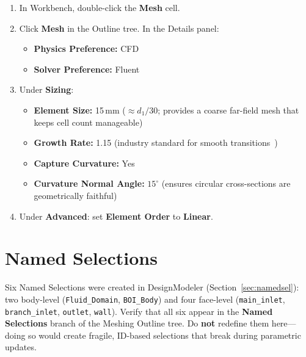 \documentclass[12pt,a4paper]{report}
\begin{document}
\begin{enumerate}
  \item In Workbench, double-click the \textbf{Mesh} cell.
  \item Click \textbf{Mesh} in the Outline tree.  In the Details panel:
  \begin{itemize}
    \item \textbf{Physics Preference:} CFD
    \item \textbf{Solver Preference:} Fluent
  \end{itemize}
  \item Under \textbf{Sizing}:
  \begin{itemize}
    \item \textbf{Element Size:} 15\,mm \quad ($\approx d_1/30$; provides a
          coarse far-field mesh that keeps cell count manageable)
    \item \textbf{Growth Rate:} 1.15 \quad (industry standard for smooth
          transitions~\cite{ANSYSFluentUG2024})
    \item \textbf{Capture Curvature:} Yes
    \item \textbf{Curvature Normal Angle:} $15^\circ$ \quad (ensures circular
          cross-sections are geometrically faithful)
  \end{itemize}
  \item Under \textbf{Advanced}: set \textbf{Element Order} to \textbf{Linear}.
\end{enumerate}


\section{Named Selections}

Six Named Selections were created in DesignModeler
(Section~\ref{sec:namedsel}): two body-level (\texttt{Fluid\_Domain},
\texttt{BOI\_Body}) and four face-level (\texttt{main\_inlet},
\texttt{branch\_inlet}, \texttt{outlet}, \texttt{wall}).  Verify that
all six appear in the \textbf{Named Selections} branch of the Meshing
Outline tree.  Do \textbf{not} redefine them here---doing so would
create fragile, ID-based selections that break during parametric updates.

\medskip
\noindent{}
\end{document}

